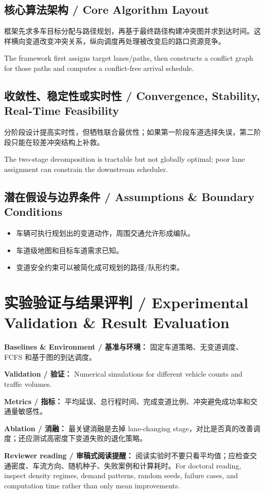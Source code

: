 \documentclass[UTF8,a4paper,11pt,fontset=fandol]{ctexart}
\begin{document}
\subsection{核心算法架构 / Core Algorithm Layout}
框架先求多车目标分配与路径规划，再基于最终路径构建冲突图并求到达时间。这样横向变道改变冲突关系，纵向调度再处理被改变后的路口资源竞争。

The framework first assigns target lanes/paths, then constructs a conflict graph for those paths and computes a conflict-free arrival schedule.

\subsection{收敛性、稳定性或实时性 / Convergence, Stability, Real-Time Feasibility}
分阶段设计提高实时性，但牺牲联合最优性；如果第一阶段车道选择失误，第二阶段只能在较差冲突结构上补救。

The two-stage decomposition is tractable but not globally optimal; poor lane assignment can constrain the downstream scheduler.

\subsection{潜在假设与边界条件 / Assumptions \& Boundary Conditions}
\begin{itemize}
\item 车辆可执行规划出的变道动作，周围交通允许形成编队。
\item 车道级地图和目标车道需求已知。
\item 变道安全约束可以被简化成可规划的路径/队形约束。
\end{itemize}


\section{实验验证与结果评判 / Experimental Validation \& Result Evaluation}
\textbf{Baselines \& Environment / 基准与环境：} 固定车道策略、无变道调度、FCFS 和基于图的到达调度。

\textbf{Validation / 验证：} Numerical simulations for different vehicle counts and traffic volumes.

\textbf{Metrics / 指标：} 平均延误、总行程时间、完成变道比例、冲突避免成功率和交通量敏感性。

\textbf{Ablation / 消融：} 最关键消融是去掉 lane-changing stage，对比是否真的改善调度；还应测试高密度下变道失败的退化策略。

\textbf{Reviewer reading / 审稿式阅读提醒：} 阅读实验时不要只看平均值；应检查交通密度、车流方向、随机种子、失败案例和计算耗时。For doctoral reading, inspect density regimes, demand patterns, random seeds, failure cases, and computation time rather than only mean improvements.
\end{document}
